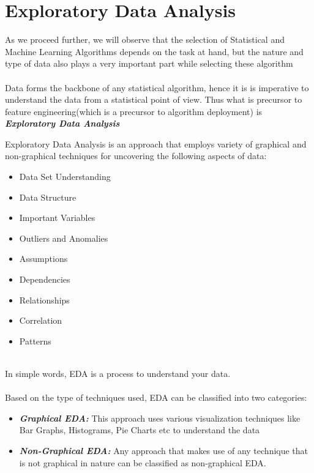 \documentclass[twoside,12pt]{report}  %
\begin{document}
\chapter{Exploratory Data Analysis}
\noindent
As we proceed further, we will observe that the selection of Statistical and Machine Learning Algorithms depends on the task at hand, but the nature and type of data also plays a very important part while selecting these algorithm
\\
\\
Data forms the backbone of any statistical algorithm, hence it is is imperative to understand the data from a statistical point of view. Thus what is precursor to feature engineering(which is a precursor to algorithm deployment) is \textbf{\textit{Exploratory Data Analysis}}
\\
\begin{tcolorbox}[colback=red!5!white, colframe=red!75!black, title = \textbf{Exploratory Data Analysis}]
	Exploratory Data Analysis is an approach that employs variety of graphical and non-graphical techniques for uncovering the following aspects of data:
	\begin{itemize}
		\item Data Set Understanding
		\item Data Structure
		\item Important Variables
		\item Outliers and Anomalies
		\item Assumptions
		\item Dependencies
		\item Relationships
		\item Correlation
		\item Patterns
	\end{itemize}
\end{tcolorbox}
\noindent
\\
In simple words, EDA is a process to understand your data.
\\ 
\\
Based on the type of techniques used, EDA can be classified into two categories:
\begin{itemize}
	\item \textbf{\textit{Graphical EDA:}} This approach uses various visualization techniques like Bar Graphs, Histograms, Pie Charts etc to understand the data
	\item \textbf{\textit{Non-Graphical EDA:}} Any approach that makes use of any technique that is not graphical in nature can be classified as non-graphical EDA. 
\end{itemize} 
\end{document}
